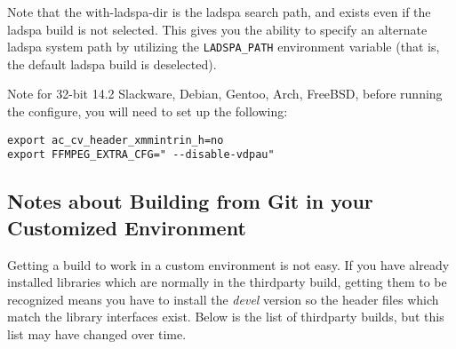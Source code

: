 Note that the with-ladspa-dir is the ladspa search path, and
exists even if the ladspa build is not selected.  This gives you
the ability to specify an alternate ladspa system path by
utilizing the \texttt{LADSPA\_PATH} environment variable (that is,
the default ladspa build is deselected).

Note for 32-bit 14.2 Slackware, Debian, Gentoo, Arch, FreeBSD,
before running the configure, you will need to set up the following:

\begin{lstlisting}[style=sh]
export ac_cv_header_xmmintrin_h=no
export FFMPEG_EXTRA_CFG=" --disable-vdpau"
\end{lstlisting}


\subsection{Notes about Building from Git in your Customized Environment}%
\label{sub:notes_about_building_from_git_in_your_customized_environment}

Getting a build to work in a custom environment is not easy.  If you
have already installed libraries which are normally in the
thirdparty build, getting them to be recognized means you have to
install the \textit{devel} version so the header files which match
the library interfaces exist.  Below is the list of thirdparty
builds, but this list may have changed over time.

